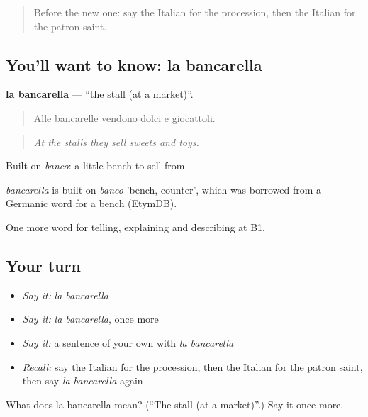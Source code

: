 \label{lesson:IT-C450-bancarella}



\begin{quote}
Before the new one: say the Italian for the procession, then the Italian for the patron saint.
\end{quote}

\subsection*{You'll want to know: la bancarella}
\textbf{la bancarella} — \textquotedblleft{}the stall (at a market)\textquotedblright{}.

\begin{quote}
Alle bancarelle vendono dolci e giocattoli.
\end{quote}

\begin{quote}
\emph{At the stalls they sell sweets and toys.}
\end{quote}

Built on \emph{banco}: a little bench to sell from.

\begin{cousinweb}
\emph{bancarella} is built on \emph{banco} 'bench, counter', which was borrowed from a Germanic word for a bench (EtymDB).
\end{cousinweb}

\begin{grammarlens}[title={What you've built}]
One more word for telling, explaining and describing at B1.
\end{grammarlens}

\subsection*{Your turn}
\begin{itemize}
\raggedright
  \item \emph{Say it:} \emph{la bancarella}
  \item \emph{Say it:} \emph{la bancarella}, once more
  \item \emph{Say it:} a sentence of your own with \emph{la bancarella}
  \item \emph{Recall:} say the Italian for the procession, then the Italian for the patron saint, then say \emph{la bancarella} again
\end{itemize}

\begin{tcolorbox}[breakable,colback=teal!4,colframe=teal!35!black,title={Before you move on}]
What does la bancarella mean? (\textquotedblleft{}The stall (at a market)\textquotedblright{}.) Say it once more.
\end{tcolorbox}
